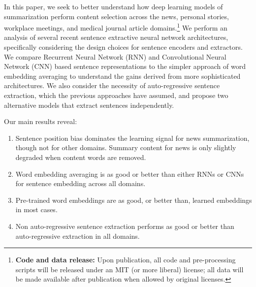 In this paper, we seek to better understand how deep learning models of 
summarization perform content selection across the news, personal stories,
workplace meetings, and medical journal article domains.\footnote{\textbf{Code and data release:} Upon
publication, all code and pre-processing scripts
will be released under an MIT (or more liberal)
license; all data will be made available after
publication when allowed by original licenses.}
We perform an analysis 
of several recent sentence extractive neural network architectures, 
specifically considering the design choices for sentence encoders and 
extractors. We compare Recurrent Neural Network (RNN) and Convolutional Neural
Network (CNN) based sentence representations to the 
simpler approach of word embedding averaging to understand the gains 
derived from more sophisticated architectures.
We also consider the necessity of auto-regressive sentence extraction, 
which the previous approaches have assumed,
and propose two alternative models that extract sentences independently.

%
%
%
Our main results reveal:
\begin{enumerate}
\item Sentence position bias dominates the learning signal for news summarization, though not for
other domains. %
Summary content for news is only slightly degraded when content words
are removed. 
\item Word embedding averaging is as good or better than either RNNs or CNNs for sentence embedding across all domains.
\item Pre-trained word embeddings are as good, or better than, learned embeddings in most cases.
\item Non auto-regressive sentence extraction performs as good or better 
     than auto-regressive extraction in all
    domains.
    
\end{enumerate} 

